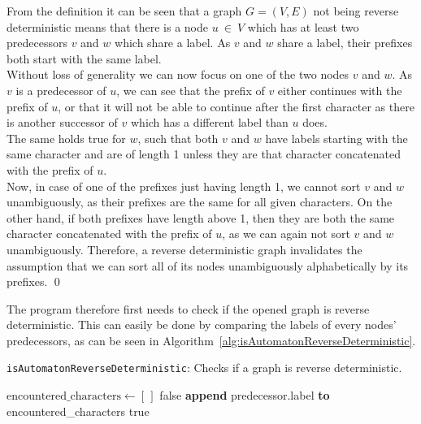 \documentclass[a4paper,12pt,twoside,BCOR=10mm]{scrbook}
\begin{document}
From the definition it can be seen that a graph $ G = (V, E) $ not being reverse deterministic means that there
is a node $ u {\: \in \:} V $ which has at least two predecessors $ v $ and $ w $ which share a label.
As $ v $ and $ w $ share a label, their prefixes both start with the same label. \\
Without loss of generality we can now focus on one of the two nodes $ v $ and $ w $.
As $ v $ is a predecessor of $ u $, we can see that the
prefix of $ v $ either continues with the prefix of $ u $,
or that it will not be able to continue after the first character
as there is another successor of $ v $ which has a different label than $ u $ does. \\
The same holds true for $ w $, such that both $ v $ and $ w $ have labels starting
with the same character and are of length 1 unless they are that character concatenated
with the prefix of $ u $. \\
Now, in case of one of the prefixes just having length 1, we cannot sort $ v $ and $ w $
unambiguously, as their prefixes are the same for all given characters.
On the other hand, if both prefixes have length above 1, then they are both
the same character concatenated with the prefix of $ u $, as we can again not sort $ v $ and $ w $
unambiguously.
Therefore, a reverse deterministic graph invalidates the assumption that we can sort
all of its nodes unambiguously alphabetically by its prefixes. \qed

The program therefore first needs to check if the opened graph is reverse deterministic.
This can easily be done by comparing the labels of every nodes' predecessors, as can be seen
in Algorithm~\ref{alg:isAutomatonReverseDeterministic}.

\begin{algorithm}
\caption[\texttt{isAutomatonReverseDeterministic}: Check if graph is rev. deterministic]{\texttt{isAutomatonReverseDeterministic}: Checks if a graph is reverse deterministic.}
\label{alg:isAutomatonReverseDeterministic}
\begin{algorithmic}[1]
	\State $ \textrm{encountered\_characters} \gets [ \, ] $
			\State \Return false
		\Else
			\State \textbf{append} predecessor.label \textbf{to} encountered\_characters
		\EndIf
	\EndFor
\EndFor
\State \Return true
\end{algorithmic}
\end{algorithm}
\end{document}
